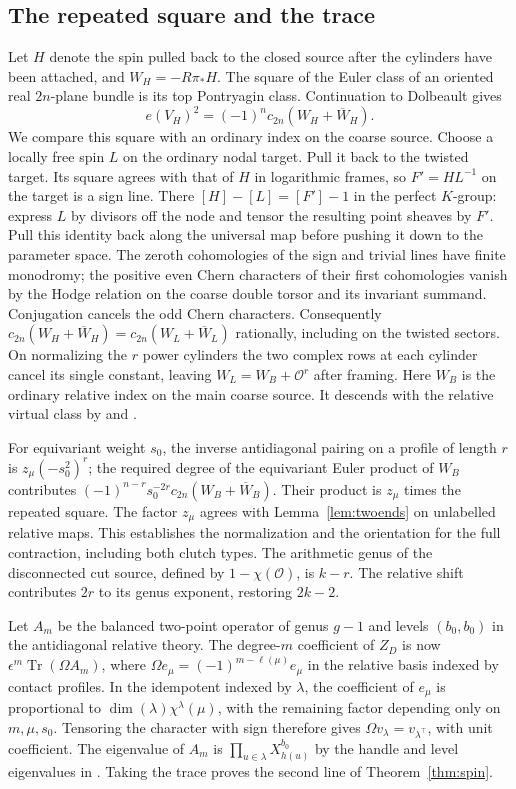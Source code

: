 \subsection{The repeated square and the trace}
Let \(H\) denote the spin pulled back to the closed source after the
cylinders have been attached, and \(W_H=-R\pi_*H\). The square of
the Euler class of an oriented real \(2n\)-plane bundle is its top
Pontryagin class. Continuation to Dolbeault gives
\[
 e(V_H)^2=(-1)^n c_{2n}(W_H+\overline W_H).
\]
We compare this square with an ordinary index on the coarse source.
Choose a locally free spin \(L\) on the ordinary nodal target. Pull
it back to the twisted target. Its square agrees with that of \(H\)
in logarithmic frames, so \(F'=HL^{-1}\) on the target is a sign
line. There \([H]-[L]=[F']-1\) in the perfect \(K\)-group: express
\(L\) by divisors off the node and tensor the resulting point
sheaves by \(F'\). Pull this identity back along the universal map
before pushing it down to the parameter space. The zeroth
cohomologies of the sign and trivial lines have finite monodromy;
the positive even Chern characters of their first cohomologies
vanish by the Hodge relation on the coarse double torsor and its
invariant summand. Conjugation cancels the odd Chern characters.
Consequently
\(c_{2n}(W_H+\overline W_H)=c_{2n}(W_L+\overline W_L)\) rationally,
including on the twisted sectors. On normalizing the \(r\) power
cylinders the two complex rows at each cylinder cancel its single
constant, leaving \(W_L=W_B+\mathcal O^r\) after framing. Here \(W_B\)
is the ordinary relative index on the main coarse source. It
descends with the relative virtual class by
\cite[Theorem~2.1]{acw} and \cite[Theorem~1.1.2]{amw}.

For equivariant weight \(s_0\), the inverse antidiagonal pairing on
a profile of length \(r\) is \(z_\mu(-s_0^2)^r\);
the required degree of the equivariant Euler product of \(W_B\)
contributes \((-1)^{n-r}s_0^{-2r}c_{2n}(W_B+\overline W_B)\).
Their product is \(z_\mu\) times the repeated square. The factor
\(z_\mu\) agrees with Lemma~\ref{lem:twoends} on unlabelled relative
maps. This establishes the normalization and the orientation for the
full contraction, including both clutch types. The arithmetic genus
of the disconnected cut source, defined by \(1-\chi(\mathcal O)\),
is \(k-r\). The relative shift contributes \(2r\) to its genus
exponent, restoring \(2k-2\).

Let \(A_m\) be the balanced two-point operator of genus \(g-1\) and
levels \((b_0,b_0)\) in the antidiagonal relative theory. The
degree-\(m\) coefficient of \(Z_D\) is now
\(\epsilon^m\operatorname{Tr}(\Omega A_m)\), where
\(\Omega e_\mu=(-1)^{m-\ell(\mu)}e_\mu\) in the relative basis
indexed by contact profiles. In the idempotent indexed by
\(\lambda\), the coefficient of \(e_\mu\) is proportional to
\(\dim(\lambda)\chi^\lambda(\mu)\), with the remaining factor
depending only on \(m,\mu,s_0\). Tensoring the character with sign
therefore gives \(\Omega v_\lambda=v_{\lambda^\top}\), with unit
coefficient. The eigenvalue of \(A_m\) is
\(\prod_{u\in\lambda}X_{h(u)}^{b_0}\) by the handle and level
eigenvalues in \cite[\S7]{bp08}. Taking the trace proves the second
line of Theorem~\ref{thm:spin}.
